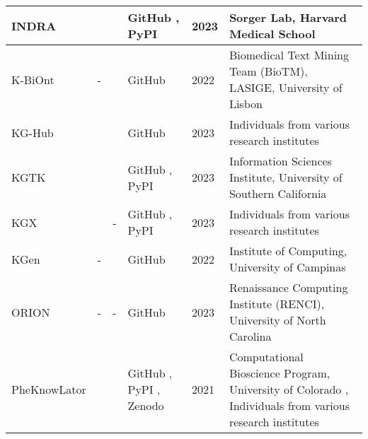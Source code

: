\documentclass{article}
\begin{document}
\begin{landscape}
\begin{xltabular}{\textwidth}{p{5cm}|p{2.2cm}|p{2.2cm}|p{2.2cm}|p{1cm}|p{6cm}}
INDRA
&
\cite{indra_website1}
\cite{indra_website2}
&
\cite{indra_publication1}
\cite{indra_publication2}
&
GitHub
\cite{indra_github},
PyPI
\cite{indra_pypi}
&
2023
&
Sorger Lab, Harvard Medical School
\cite{indra_group}
\\


\hline


K-BiOnt
&
-
&
\cite{kbiont_publication}
&
GitHub
\cite{kbiont_github}
&
2022
&
Biomedical Text Mining Team (BioTM), LASIGE, University of Lisbon
\cite{kbiont_group1}
\cite{kbiont_group2}
\\


\hline


KG-Hub
&
\cite{kghub_website}
&
\cite{kghub_publication}
&
GitHub
\cite{kghub_github}
&
2023
&
Individuals from various research institutes
\\


\hline


KGTK
&
\cite{kgtk_website}
&
\cite{kgtk_publication}
&
GitHub
\cite{kgtk_github},
PyPI
\cite{kgtk_pypi}
&
2023
&
Information Sciences Institute,
University of Southern California
\cite{kgtk_group}
\\


\hline


KGX
&
\cite{kgx_website1}
\cite{kgx_website2}
&
-
&
GitHub
\cite{kgx_github},
PyPI
\cite{kgx_pypi}
&
2023
&
Individuals from various research institutes
\\


\hline


KGen
&
-
&
\cite{kgen_publication}
&
GitHub
\cite{kgen_github}
&
2022
&
Institute of Computing, University of Campinas
\cite{kgen_group}
\\


\hline


ORION
&
-
&
-
&
GitHub
\cite{orion_github}
&
2023
&
Renaissance Computing Institute (RENCI), University of North Carolina
\cite{orion_group}
\\


\hline


PheKnowLator
&
\cite{pheknowlator_website}
&
\cite{pheknowlator_publication1}
\cite{pheknowlator_publication2}
&
GitHub
\cite{pheknowlator_github},
PyPI
\cite{pheknowlator_pypi},
Zenodo
\cite{pheknowlator_zenodo}
&
2021
&
Computational Bioscience Program, University of Colorado
\cite{pheknowlator_group},
Individuals from various research institutes
\\


\hline



\end{xltabular}
\end{landscape}
\end{document}
